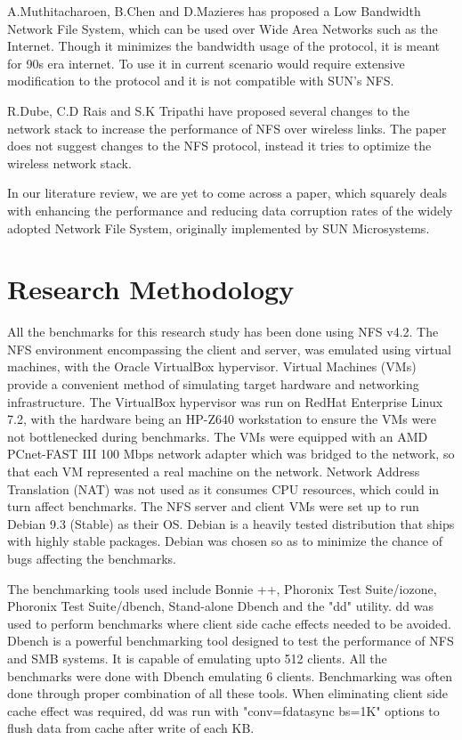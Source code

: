 \documentclass[conference]{IEEEtran}
\begin{document}
A.Muthitacharoen, B.Chen and D.Mazieres has proposed a Low Bandwidth Network
File System, which can be used over Wide Area Networks such as the Internet.
Though it minimizes the bandwidth usage of the protocol, it is meant for 90s
era internet. To use it in current scenario would require extensive 
modification to the protocol and it is not compatible with SUN's NFS.

R.Dube, C.D Rais and S.K Tripathi have proposed several changes to the
network stack to increase the performance of NFS over wireless links. The
paper does not suggest changes to the NFS protocol, instead it tries to
optimize the wireless network stack.

In our literature review, we are yet to come across a paper, which squarely
deals with enhancing the performance and reducing data corruption rates of 
the widely adopted Network File System, originally implemented by SUN 
Microsystems.

\section{Research Methodology}
All the benchmarks for this research study has been done using NFS v4.2.
The NFS environment encompassing the client and server, was emulated using
virtual machines, with the Oracle VirtualBox hypervisor. Virtual Machines 
(VMs) provide a convenient method of simulating target hardware and 
networking infrastructure. The VirtualBox hypervisor was run on RedHat 
Enterprise Linux 7.2, with the hardware being an HP-Z640 workstation to 
ensure the VMs were not bottlenecked during benchmarks. The VMs were 
equipped with an AMD PCnet-FAST III 100 Mbps network adapter which was bridged
to the network, so that each VM represented a real machine on the 
network. Network Address Translation (NAT) was not used as it consumes CPU
resources, which could in turn affect benchmarks. The NFS server and client
VMs were set up to run Debian 9.3 (Stable) as their OS. Debian is a heavily
tested distribution that ships with highly stable packages. Debian was chosen
so as to minimize the chance of bugs affecting the benchmarks.

The benchmarking tools used include Bonnie ++, Phoronix Test Suite/iozone,
Phoronix Test Suite/dbench, Stand-alone Dbench and the "dd" utility. dd was
used to perform benchmarks where client side cache effects needed to be
avoided. Dbench is a powerful benchmarking tool designed to test the
performance of NFS and SMB systems. It is capable of emulating upto 512 
clients. All the benchmarks were done with Dbench emulating 6 clients.
Benchmarking was often done through proper combination of all these tools.
When eliminating client side cache effect was required, dd was run with 
"conv=fdatasync bs=1K" options to flush data from cache after write of each
KB.
\end{document}
